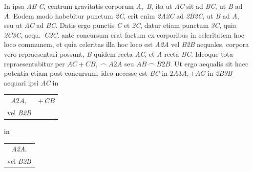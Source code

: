%
 \pstart
In ipsa \textit{AB} 
%
%
\textit{C}, centrum gravitatis\protect{} corporum \textit{A}\lbrack,\rbrack\ \textit{B}, ita ut \textit{AC} sit ad \textit{BC}, ut \textit{B} ad \textit{A}. Eodem modo
habebitur punctum 
\textit{{\scriptsize2}C}, 
erit enim 
\textit{{\scriptsize2}A{\scriptsize2}C} 
ad 
\textit{{\scriptsize2}B{\scriptsize2}C}, 
ut 
\textit{B} ad \textit{A}, seu ut \textit{AC} ad \textit{BC}. 
Datis ergo punctis \textit{C} et 
\textit{{\scriptsize2}C}, 
datur
etiam punctum \textit{{\scriptsize3}C}, quia 
\textit{{\scriptsize2}C{\scriptsize3}C}, aequ.\ \textit{C{\scriptsize2}C}. 
%
%
ante
concursum%
\protect{} erat factum ex corporibus in celeritatem hoc loco communem,%
\protect{}  et quia celeritas illa hoc loco
est 
\textit{A{\scriptsize2}A} 
vel
\textit{B{\scriptsize2}B} 
aequales, corpora vero repraesentari possunt, \textit{B} quidem recta \textit{AC}, et \textit{A} recta 
\textit{BC}. Ideoque 
%
%
tota repraesentabitur per 
$AC + CB,\ \smallfrown \ 
A{\scriptstyle \textit{2}}A$ seu $AB \ \smallfrown \ B{\scriptstyle \textit{2}}B$. 
Ut ergo aequalis sit haec %
potentia\protect{} etiam post concursum\protect{}, ideo necesse 
est \textit{BC} in 
${\scriptstyle \textit{2}}A{\scriptstyle \textit{3}}A, + AC$ 
in 
\textit{{\scriptsize2}B{\scriptsize3}B} 
aequari ipsi 
\textit{AC} 
in 
\begin{tabular}[t]{cc}
 ${A{\scriptstyle \textit{2}}A},$ & $+\ CB$ \\
vel \textit{B{\scriptsize2}B} &
\end{tabular}
in
\begin{tabular}[t]{c}
\textit{A{\scriptsize2}A}. \\
vel \textit{B{\scriptsize2}B}
\end{tabular}
